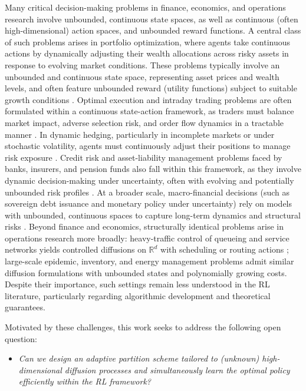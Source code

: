 \documentclass[final,supplement]{siamart251216}
\begin{document}
Many critical decision-making problems in finance, economics, and operations research involve unbounded, continuous state spaces, as well as continuous (often high-dimensional) action spaces, and unbounded reward functions. A central class of such problems arises in portfolio optimization, where agents take continuous actions by dynamically adjusting their wealth allocations across risky assets in response to evolving market conditions. These problems typically involve an unbounded and continuous state space, representing asset prices and wealth levels, and often feature unbounded reward (utility functions) subject to suitable growth conditions  \cite{black1992global,zhou2000continuous,he2015dynamic}. Optimal execution and intraday trading problems are often formulated within a continuous state-action framework, as traders must balance market impact, adverse selection risk, and order flow dynamics in a tractable manner \cite{almgren2001optimal,cartea2015algorithmic}. In dynamic hedging, particularly in incomplete markets or under stochastic volatility, agents must continuously adjust their positions to manage risk exposure \cite{carr2001pricing,duffie1997hedging}. Credit risk and asset-liability management problems faced by banks, insurers, and pension funds also fall within this framework, as they involve dynamic decision-making under uncertainty, often with evolving and potentially unbounded risk profiles \cite{tektas2005asset}. At a broader scale, macro-financial decisions (such as sovereign debt issuance and monetary policy under uncertainty) rely on models with unbounded, continuous spaces to capture long-term dynamics and structural risks \cite{blommestein2012interactions,du2020sovereign}. Beyond finance and economics, structurally identical problems arise in operations research more broadly: heavy-traffic control of queueing and service networks yields controlled diffusions on $\mathbb{R}^{d}$ with scheduling or routing actions \cite{arapostathis2016ergodic,anugu2025ergodic}; large-scale epidemic, inventory, and energy management problems admit similar diffusion formulations with unbounded states and polynomially growing costs.   Despite their importance, such settings remain less understood in the RL literature, particularly regarding algorithmic development and theoretical guarantees.

Motivated by these challenges, this work seeks to address the following open question:
\begin{itemize}
\item[$\quad$] {\it Can we design an adaptive partition scheme tailored to (unknown) high-dimensional diffusion processes and simultaneously learn the optimal policy efficiently within the RL framework?}
\end{itemize}
\end{document}
